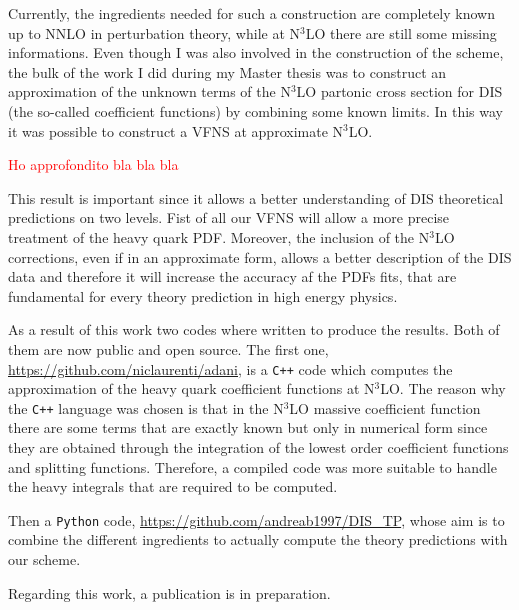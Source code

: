 \documentclass[11pt,a4paper]{moderncv}        %
\begin{document}
Currently, the ingredients needed for such a construction are completely known up to NNLO in perturbation theory, while at N$^3$LO
there are still some missing informations.
Even though I was also involved in the construction of the scheme, the bulk of the work I did during my Master thesis was to
construct an approximation of the unknown terms of the N$^3$LO partonic cross section for DIS (the so-called coefficient functions) by
combining some known limits.
In this way it was possible to construct a VFNS at approximate N$^3$LO.

\textcolor{red}{Ho approfondito bla bla bla}

This result is important since it allows a better understanding of DIS theoretical predictions on two levels.
Fist of all our VFNS will allow a more precise treatment of the heavy quark PDF.
Moreover, the inclusion of the N$^3$LO corrections, even if in an approximate form, allows a better description of the DIS data
and therefore it will increase the accuracy af the PDFs fits, that are fundamental for every theory prediction in high energy physics.

As a result of this work two codes where written to produce the results.
Both of them are now public and open source.
The first one, \url{https://github.com/niclaurenti/adani}, is a \texttt{C++} code 
which computes the approximation of the heavy quark coefficient functions at N$^3$LO.
The reason why the \texttt{C++} language was chosen is that in the N$^3$LO massive coefficient function there are some terms that are
exactly known but only in numerical form since they are obtained through the integration of the lowest order coefficient functions and
splitting functions.
Therefore, a compiled code was more suitable to handle the heavy integrals that are required to be computed.

Then a \texttt{Python} code, \url{https://github.com/andreab1997/DIS_TP}, whose aim is to combine the different ingredients to actually
compute the theory predictions with our scheme.

Regarding this work, a publication is in preparation.

\end{document}
